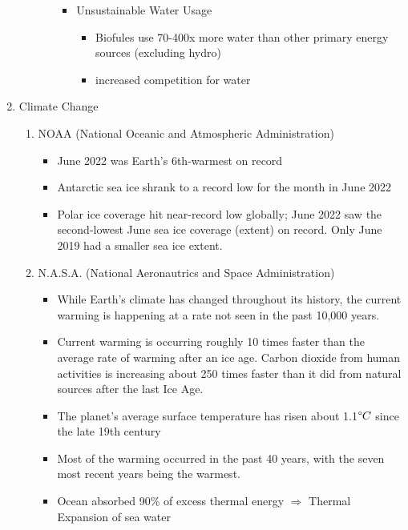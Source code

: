 \documentclass[oneside]{book}
\begin{document}
\begin{enumerate}
\begin{enumerate}
\begin{enumerate}
\begin{itemize}
                \item Unsustainable Water Usage \begin{itemize}
                    \item Biofules use 70-400x more water than other primary energy sources (excluding hydro)
                    \item increased competition for water
                \end{itemize}
            \end{itemize}
        \end{enumerate}
    \end{enumerate}
    \item Climate Change
    \begin{enumerate}
        \item NOAA (National Oceanic and Atmospheric Administration) \begin{itemize}
            \item June 2022 was Earth’s 6th-warmest on record
            \item Antarctic sea ice shrank to a record low for the month in June 2022
            \item Polar ice coverage hit near-record low globally; June 2022 saw the second-lowest June sea ice coverage (extent) on record. Only June 2019 had a smaller sea ice extent. 
        \end{itemize}
        \item N.A.S.A. (National Aeronautrics and Space Administration) \begin{itemize}
            \item \footnotesize While Earth’s climate has changed throughout its history, \normalsize the current warming is happening at a rate not seen in the past 10,000 years.
            \item Current warming is occurring roughly 10 times faster than the average rate of warming after an ice age. Carbon dioxide from human activities is increasing about 250 times faster than it did from natural sources after the last Ice Age.
            \item The planet's average surface temperature has risen about 1.1\(\text{\degree} C\) since the late 19th century
            \item Most of the warming occurred in the past 40 years, with the seven most recent years being the warmest.
            \item Ocean absorbed 90\% of excess thermal energy \( \Rightarrow \) Thermal Expansion of sea water

\end{itemize}
\end{enumerate}
\end{enumerate}
\end{document}
